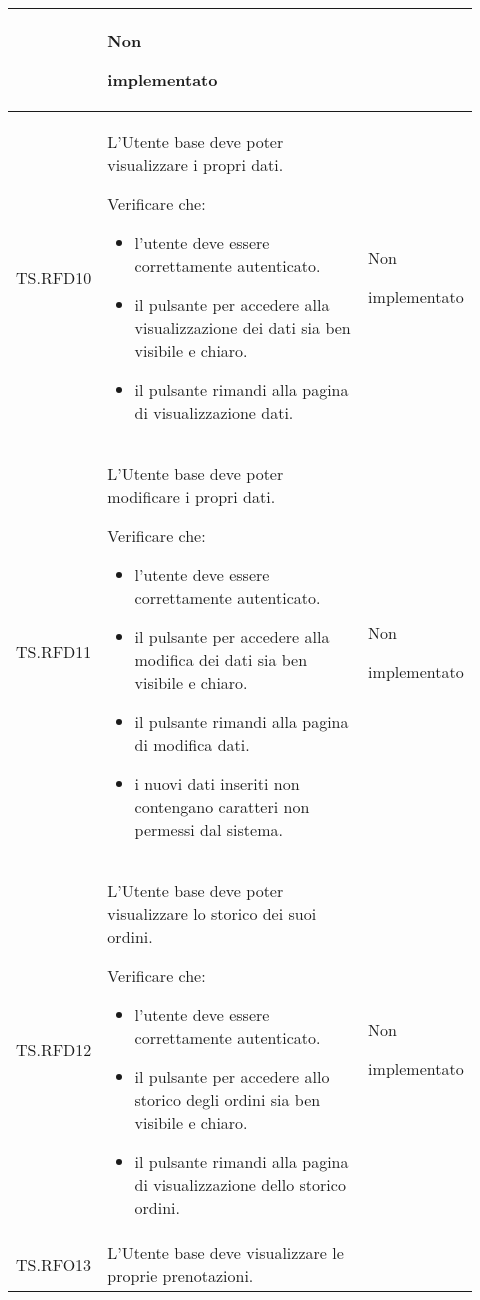\begin{longtable}{|p{0.10\linewidth}|p{0.70\linewidth}|p{0.12\linewidth}|}
\begin{itemize}
    \end{itemize}&
    Non \par implementato  \\
    \hline
    TS.RFD10& 
    L'Utente base deve poter visualizzare i propri dati. \par 
    Verificare che: 
    \begin{itemize}
        \item l'utente deve essere correttamente autenticato.
        \item il pulsante per accedere alla visualizzazione dei dati sia ben visibile e chiaro.
        \item il pulsante rimandi alla pagina di visualizzazione dati.
    \end{itemize}&
    Non \par implementato  \\
    \hline
    TS.RFD11& 
    L'Utente base deve poter modificare i propri dati. \par 
    Verificare che: 
    \begin{itemize}
        \item l'utente deve essere correttamente autenticato.
        \item il pulsante per accedere alla modifica dei dati sia ben visibile e chiaro.
        \item il pulsante rimandi alla pagina di modifica dati.
        \item i nuovi dati inseriti non contengano caratteri non permessi dal sistema.
    \end{itemize}&
    Non \par implementato  \\
    \hline
    TS.RFD12& 
    L’Utente base deve poter visualizzare lo storico dei suoi ordini. \par 
    Verificare che: 
    \begin{itemize}
        \item l'utente deve essere correttamente autenticato.
        \item il pulsante per accedere allo storico degli ordini sia ben visibile e chiaro.
        \item il pulsante rimandi alla pagina di visualizzazione dello storico ordini.
    \end{itemize}&
    Non \par implementato  \\
    \hline
    TS.RFO13 & 
    L'Utente base deve visualizzare le proprie prenotazioni. \par 

\end{longtable}
